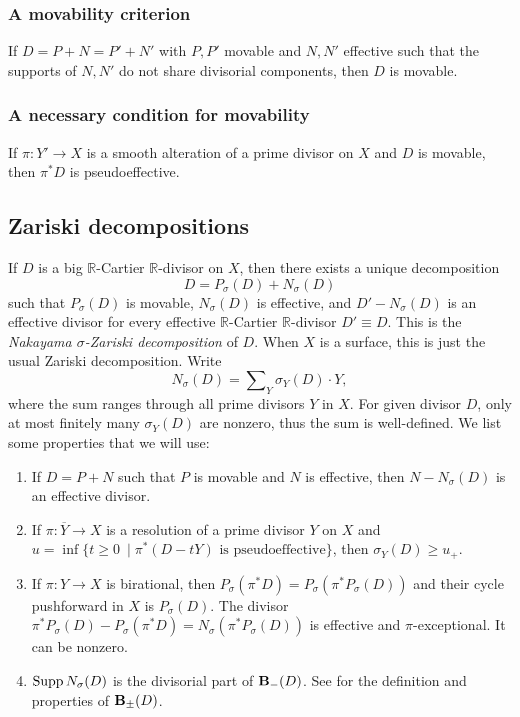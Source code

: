 \documentclass[12pt]{amsart}
\theoremstyle{definition}
\newcommand{\bb}{\ensuremath{\mathfrak{b}}}
\renewcommand{\geq}{\geqslant}
\newcommand{\?}{ \circled{{\large\bf ?}}}
\let\bb\mathbb
\begin{document}
\subsubsection{A movability criterion}\label{subsec:movtest}
If $D=P+N=P'+N'$ with $P,P'$ movable and $N,N'$ effective such that the supports of $N,N'$ do not share divisorial components, then $D$ is movable.

\subsubsection{A necessary condition for movability}\label{subsec:movcond}
If $\pi:Y'\to X$ is a smooth alteration of a prime divisor on $X$ and $D$ is movable, then $\pi^*D$ is pseudoeffective. 

\subsection{Zariski decompositions}\label{subsec:Nakayama}

If $D$ is a big $\mathbb R$-Cartier $\mathbb R$-divisor on $X$, then there exists a unique decomposition
\[D=P_{\sigma}(D)+N_{\sigma}(D)\]
such that $P_{\sigma}(D)$ is movable, $N_{\sigma}(D)$ is effective, and $D'-N_{\sigma}(D)$ is an effective divisor for every effective $\bb R$-Cartier $\bb R$-divisor $D'\equiv D$. This is the \emph{Nakayama $\sigma$-Zariski decomposition} of $D$. When $X$ is a surface, this is just the usual Zariski decomposition.
Write 
\[N_{\sigma}(D)=\sum\nolimits_Y\sigma_Y(D)\cdotp Y,\] where the sum ranges through all prime divisors $Y$ in $X$. For given divisor $D$, only at most finitely many $\sigma_Y(D)$ are nonzero, thus the sum is well-defined.
We list some properties that we will use:
\begin{enumerate}
	\item If $D=P+N$ such that $P$ is movable and $N$ is effective, then $N-N_{\sigma}(D)$ is an effective divisor. 
	\smallskip
	
	\item If $\pi:\overline Y\to X$ is a resolution of a prime divisor $Y$ on $X$ and $u=\inf\{t\geq0\ \mid \pi^*(D-tY)\text{ is pseudoeffective}\}$, then $\sigma_Y(D)\geq u_+$. 
	\smallskip
	
	\item If $\pi:Y\to X$ is birational, then $P_{\sigma}(\pi^*D)=P_{\sigma}(\pi^*P_{\sigma}(D))$ and their cycle pushforward in $X$ is $P_{\sigma}(D)$. The divisor  $\pi^*P_{\sigma}(D)-P_{\sigma}(\pi^*D)=N_{\sigma}(\pi^*P_{\sigma}(D))$ 
	is effective and $\pi$-exceptional. It can be nonzero.
	\smallskip
	
	\item ${\rm Supp}\, N_{\sigma}(D)$ is the divisorial part of ${\bf B}_-(D)$. See \cite{ELMNP06} for the definition and properties of ${\bf B}_{\pm}(D)$.
\end{enumerate}
\end{document}
